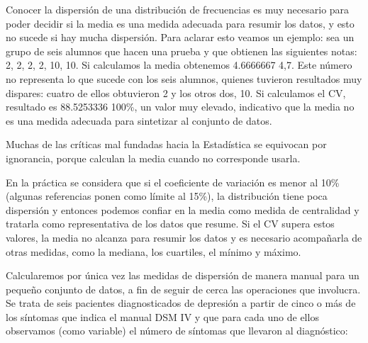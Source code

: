 \documentclass[]{book}
\begin{document}
Conocer la dispersión de una distribución de frecuencias es muy
necesario para poder decidir si la media es una medida adecuada para
resumir los datos, y esto no sucede si hay mucha dispersión. Para
aclarar esto veamos un ejemplo: sea un grupo de seis alumnos que hacen una prueba y que obtienen las siguientes notas: 2, 2, 2, 2, 10, 10. Si calculamos la media obtenemos 4.6666667 4,7. Este número no representa lo que sucede con los seis alumnos, quienes tuvieron resultados muy dispares: cuatro de ellos obtuvieron 2 y los otros dos, 10. Si calculamos el CV, resultado es 88.5253336 100\%, un valor muy elevado, indicativo que la media no es una medida adecuada para sintetizar al conjunto de datos.

Muchas de las críticas mal fundadas hacia la Estadística se equivocan por ignorancia, porque calculan la media cuando no corresponde usarla.

En la práctica se considera que si el coeficiente de variación es menor al 10\% (algunas referencias ponen como límite al 15\%), la distribución tiene poca dispersión y entonces podemos confiar en la media como medida de centralidad y tratarla como representativa de los datos que resume. Si el CV supera estos valores, la media no alcanza para resumir los datos y es necesario acompañarla de otras medidas, como la mediana, los cuartiles, el mínimo y máximo.

Calcularemos por única vez las medidas de dispersión de manera manual
para un pequeño conjunto de datos, a fin de seguir de cerca las
operaciones que involucra. Se trata de seis pacientes diagnosticados de depresión a partir de cinco o más de los síntomas que indica el manual DSM IV y que para cada uno de ellos observamos (como variable) el número de síntomas que llevaron al diagnóstico:
\end{document}
